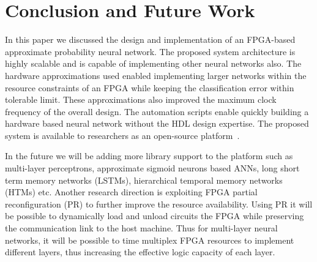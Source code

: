 \section{Conclusion and Future Work}
\label{sec_conclusion}

In this paper we discussed the design and implementation of an FPGA-based approximate probability neural network.
The proposed system architecture is highly scalable and is capable of implementing other neural networks also.
The hardware approximations used enabled implementing larger networks within the resource constraints of an FPGA while keeping the classification error within tolerable limit.
These approximations also improved the maximum clock frequency of the overall design.
The automation scripts enable quickly building a hardware based neural network without the HDL design expertise.
The proposed system is available to researchers as an open-source platform~\cite{blanked}.

In the future we will be adding more library support to the platform such as multi-layer perceptrons, approximate sigmoid neurons based ANNs, long short term memory networks (LSTMs), hierarchical temporal memory networks (HTMs) etc.
Another research direction is exploiting FPGA partial reconfiguration (PR) to further improve the resource availability.
Using PR it will be possible to dynamically load and unload circuits the FPGA while preserving the communication link to the host machine.
Thus for multi-layer neural networks, it will be possible to time multiplex FPGA resources to implement different layers, thus increasing the effective logic capacity of each layer.

